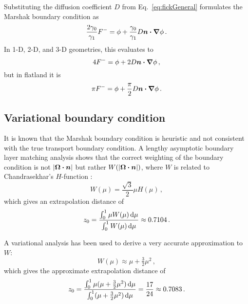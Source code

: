 Substituting the diffusion coefficient $D$ from Eq.~\eqref{eq:fickGeneral}
formulates the Marshak boundary condition as
\begin{equation*}
\frac{2\gamma_0}{\gamma_1} F^{-}
= \phi + \frac{\gamma_0}{\gamma_1} D \bm{n} \bm{\cdot} \bm{\nabla} \phi\,.
\end{equation*}
In 1-D, 2-D, and 3-D geometries, this evaluates to
\begin{equation*}
4 F^{-}
= \phi + 2 D \bm{n} \bm{\cdot} \bm{\nabla} \phi\,,
\end{equation*}
but in flatland it is
\begin{equation}\label{eq:flatlandDiffusionMarshak}
\pi F^{-}
= \phi + \frac{\pi}{2} D \bm{n} \bm{\cdot} \bm{\nabla} \phi\,.
\end{equation}

\subsection{Variational boundary condition} \label{sec:varBndy}
It is known that the Marshak boundary condition is heuristic and not consistent with the
true transport boundary condition. A lengthy asymptotic boundary layer
matching analysis \cite{Hab1975} shows that the correct weighting of the
boundary condition is not $\left| \bm{\Omega}\bm{\cdot}\bm{n} \right|$ but rather
$W(\left| \bm{\Omega}\bm{\cdot}\bm{n} \right|)$, where $W$ is related to Chandrasekhar's
$H$-function \cite{Cha1960}:
\begin{equation*}
  W(\mu) = \frac{\sqrt{3}}{2} \mu H(\mu) \,,
\end{equation*}
which gives an extrapolation distance of
\begin{align*}
  z_0 = \frac{\int_{0}^{1} \mu W(\mu) \mathop{}\!\mathrm{d} \mu}{\int_{0}^{1} W(\mu) \mathop{}\!\mathrm{d}
  \mu} \approx 0.7104\,.
\end{align*}

A variational analysis \cite{Mal1991} has been used to
derive a very accurate approximation to $W$:
\begin{equation*}
W(\mu) \approx \mu + \tfrac{3}{2} \mu^2 \,,
\end{equation*}
which gives the approximate extrapolation distance of
\begin{equation*}
  z_0 = \frac{\int_{0}^{1} \mu (\mu + \tfrac{3}{2} \mu^2 ) \mathop{}\!\mathrm{d}
  \mu}{\int_{0}^{1} (\mu + \tfrac{3}{2} \mu^2 ) \mathop{}\!\mathrm{d} \mu} 
  = \frac{17}{24} \approx 0.7083 \,.
\end{equation*}

